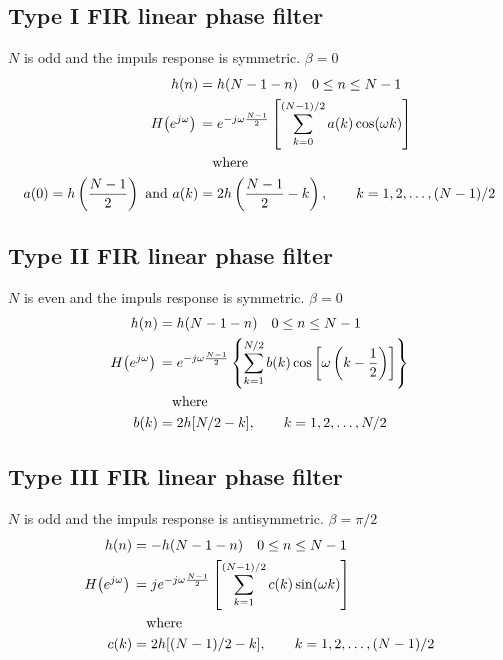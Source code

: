 \documentclass[accentcolor=tud4c,9.5pt,nochapname,bigchapter,paper=a5report]{tudreport}
\begin{document}
\subsection {Type I FIR linear phase filter}
$N$ is odd and the impuls response is symmetric. $\beta=0$ 
\begin{subequations}
\begin{align}
	h(n)&=h(N-1-n) \quad 0\leq n \leq N-1 \\
	H{\left(e^{j\omega}\right)}\, &= e^{-j\omega \frac{N-1}{2}}\left[{\sum\limits_{k=0}^{(N-1)/2} a(k)\cos(\omega k)}\right]\\
	&\quad\text{where}\notag\\
	a(0)=h\left(\frac{N-1}{2}\right) \text{ and } a(k)&=2h\left(\frac{N-1}{2}-k\right), \quad\quad k=1,2,\ldots,(N-1)/2 \notag
\end{align}
\end{subequations}

\subsection {Type II FIR linear phase filter}
$N$ is even and the impuls response is symmetric. $\beta=0$ 
\begin{subequations}
\begin{align}
	h(n)&=h(N-1-n) \quad 0\leq n \leq N-1 \\
	H{\left(e^{j\omega}\right)}\, &= e^{-j\omega \frac{N-1}{2}}\left\{{\sum\limits_{k=1}^{N/2} b(k)\cos\left[\omega \left(k-\frac{1}{2}\right)\right]}\right\}\\
	&\quad\text{where}\notag\\
	b(k)&=2h[N/2-k], \quad\quad k=1,2,\ldots,N/2 \notag
\end{align}
\end{subequations}

\subsection {Type III FIR linear phase filter}
$N$ is odd and the impuls response is antisymmetric. $\beta=\pi/2$ 
\begin{subequations}
\begin{align}
	h(n)&=-h(N-1-n) \quad 0\leq n \leq N-1 \\
	H{\left(e^{j\omega}\right)}\, &= je^{-j\omega \frac{N-1}{2}}\left[{\sum\limits_{k=1}^{(N-1)/2} c(k)\sin(\omega k)}\right]\\
	&\quad\text{where}\notag\\
	c(k)&=2h[(N-1)/2-k], \quad\quad k=1,2,\ldots,(N-1)/2 \notag
\end{align}
\end{subequations}
\end{document}
